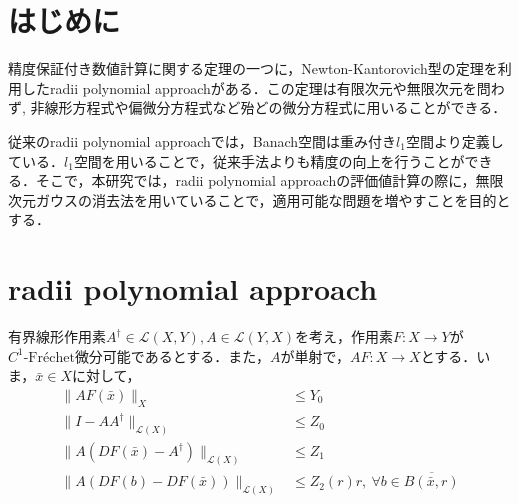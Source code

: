 \documentclass[a4paper,10pt,twocolumn]{jsarticle}
\title{\vspace{-8mm}{\Large \gtfamily\mdseries\upshape 無限次元ガウスの消去法を用いた \rad{}改良 }\vspace{-3mm}}
\date{}
\author{（指導教員 関根 晃太 准教授） \\ 関根研究室 2131701 齋藤 悠希
\vspace{-5mm}}
\newcommand{\rad}{radii polynomial approach}
\newcommand{\nk}{Newton-Kantorovich}
\newcommand{\infg}{無限次元ガウスの消去法}
\newcommand{\fre}{Fr\'{e}chet}
\begin{document}
\maketitle
\vspace{-10mm}



\section{はじめに}
\vspace{-1mm}
精度保証付き数値計算に関する定理の一つに，\nk{}型の定理を利用した\rad{}がある．この定理は有限次元や無限次元を問わず, 非線形方程式や偏微分方程式など殆どの微分方程式に用いることができる．

従来の\rad{}では，Banach空間は重み付き$l_1$空間より定義している．$l_1$空間を用いることで，従来手法よりも精度の向上を行うことができる．そこで，本研究では，\rad{}の評価値計算の際に，\infg{}を用いていることで，適用可能な問題を増やすことを目的とする．


\vspace{-1mm}
\section{\rad{}}
\vspace{-1mm}

\begin{Thm}
  有界線形作用素$A^\dagger \in \mathcal{L}(X, Y), A \in \mathcal{L}(Y, X)$を考え，作用素$F:X \rightarrow Y$が$C^1\text{-\fre{}}$微分可能であるとする．また，$A$が単射で，$AF:X \rightarrow X$とする．いま，$\bar{x} \in X$に対して，
  \begin{equation}
    \begin{split}
      \|AF(\bar{x})\|_X                             & \leq Y_0                                             \\
      \|I-AA^\dagger\|_{\mathcal{L}(X)}              & \leq Z_0                                             \\
      \|A(DF(\bar{x})-A^\dagger)\|_{\mathcal{L}(X)} & \leq Z_1                                             \\
      \|A(DF(b)-DF(\bar{x}))\|_{\mathcal{L}(X)}       & \leq Z_2(r)r,\ \forall b \in \overline{B(\bar{x},r)}
    \end{split}
  \end{equation}
\end{Thm}
\end{document}
